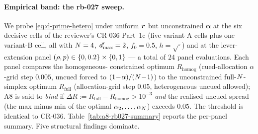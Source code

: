 \paragraph{Empirical band: the rb-027 sweep.}
We probe \eqref{eq:d-prime-hetero} under uniform
$\boldsymbol{r}$ but unconstrained $\boldsymbol{\alpha}$ at the
six decisive cells of the reviewer's CR-036 Part~1c (five
variant-A cells plus one variant-B cell, all with $N = 4$,
$d'_{\max} = 2$, $f_0 = 0.5$, $h = \sqrt{\cdot}$) and at the lever-
extension panel $(\rho, p) \in \{0, 0.2\} \times \{0, 1\}$ — a total
of $24$ panel evaluations. Each panel compares the homogeneous-
constrained optimum $R_{\mathrm{homog}}$ (cued-allocation $\alpha$-grid
step $0.005$, uncued forced to $(1\!-\!\alpha)/(N\!-\!1)$) to the
unconstrained full-$N$-simplex optimum $R_{\mathrm{full}}$
(allocation-grid step $0.05$, heterogeneous uncued allowed); A8 is
said to \emph{bind} if $\Delta R := R_{\mathrm{full}} - R_{\mathrm{homog}}
> 10^{-3}$ \emph{and} the realised uncued spread (the max minus min
of the optimal $\alpha_2, \ldots, \alpha_{N}$) exceeds $0.05$. The
threshold is identical to CR-036. Table~\ref{tab:a8-rb027-summary}
reports the per-panel summary. Five structural findings dominate.

